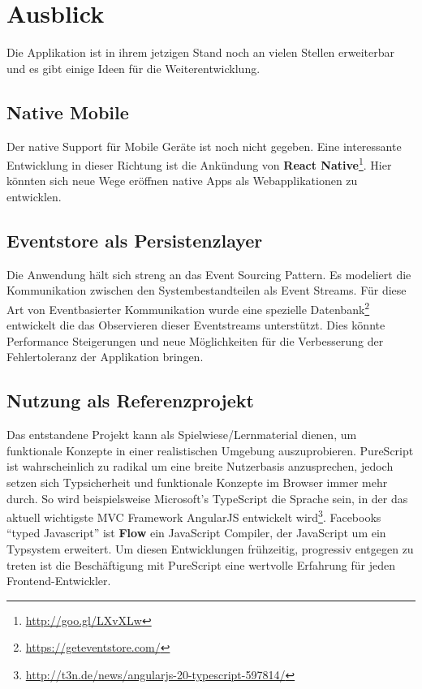 \section{Ausblick}
Die Applikation ist in ihrem jetzigen Stand noch an vielen Stellen
erweiterbar und es gibt einige Ideen für die Weiterentwicklung.

\subsection{Native Mobile}
Der native Support für Mobile Geräte ist noch nicht gegeben. Eine
interessante Entwicklung in dieser Richtung ist die Ankündung von
\textbf{React Native}\footnote{\url{http://goo.gl/LXvXLw}}.
Hier könnten sich neue Wege eröffnen native Apps als Webapplikationen
zu entwicklen.

\subsection{Eventstore als Persistenzlayer}
Die Anwendung hält sich streng an das \gls{Event Sourcing} Pattern. Es
modeliert die Kommunikation zwischen den Systembestandteilen als Event
Streams. Für diese Art von Eventbasierter Kommunikation wurde eine spezielle
Datenbank\footnote{\url{https://geteventstore.com/}} entwickelt die
das Observieren dieser Eventstreams unterstützt. Dies könnte
Performance Steigerungen und neue Möglichkeiten für die Verbesserung
der Fehlertoleranz der Applikation bringen.

\subsection{Nutzung als Referenzprojekt}
Das entstandene Projekt kann als Spielwiese/Lernmaterial dienen, um
funktionale Konzepte in einer realistischen Umgebung auszuprobieren.
PureScript ist wahrscheinlich zu radikal um eine breite Nutzerbasis
anzusprechen, jedoch setzen sich Typsicherheit und funktionale
Konzepte im Browser immer mehr durch. So wird beispielsweise Microsoft's
TypeScript die Sprache sein, in der das aktuell wichtigste MVC
Framework AngularJS entwickelt wird\footnote{\url{http://t3n.de/news/angularjs-20-typescript-597814/}}.
Facebooks ``typed Javascript'' ist \textbf{Flow} ein JavaScript
Compiler, der JavaScript um ein Typsystem erweitert. Um diesen
Entwicklungen frühzeitig, progressiv entgegen zu treten ist die
Beschäftigung mit PureScript eine wertvolle Erfahrung für jeden
Frontend-Entwickler.

